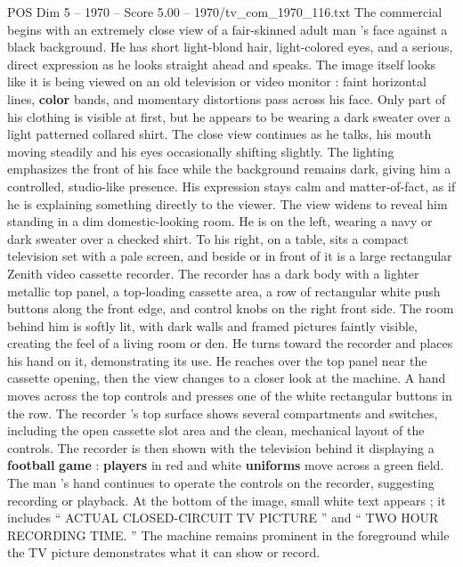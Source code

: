 \begin{textsample}{POS Dim 5 – 1970 – Score 5.00 – 1970/tv\_com\_1970\_116.txt}  \label{ex:f5_pos_087}
The commercial begins with an extremely close view of a fair-skinned adult man ’s face against a black background.
He has short light-blond hair, light-colored eyes, and a serious, direct expression as he looks straight ahead and speaks.
The image itself looks like it is being viewed on an old television or video monitor : faint horizontal lines, \textbf{color} bands, and momentary distortions pass across his face.
Only part of his clothing is visible at first, but he appears to be wearing a dark sweater over a light patterned collared shirt.
The close view continues as he talks, his mouth moving steadily and his eyes occasionally shifting slightly.
The lighting emphasizes the front of his face while the background remains dark, giving him a controlled, studio-like presence.
His expression stays calm and matter-of-fact, as if he is explaining something directly to the viewer.
The view widens to reveal him standing in a dim domestic-looking room.
He is on the left, wearing a navy or dark sweater over a checked shirt.
To his right, on a table, sits a compact television set with a pale screen, and beside or in front of it is a large rectangular Zenith video cassette recorder.
The recorder has a dark body with a lighter metallic top panel, a top-loading cassette area, a row of rectangular white push buttons along the front edge, and control knobs on the right front side.
The room behind him is softly lit, with dark walls and framed pictures faintly visible, creating the feel of a living room or den.
He turns toward the recorder and places his hand on it, demonstrating its use.
He reaches over the top panel near the cassette opening, then the view changes to a closer look at the machine.
A hand moves across the top controls and presses one of the white rectangular buttons in the row.
The recorder ’s top surface shows several compartments and switches, including the open cassette slot area and the clean, mechanical layout of the controls.
The recorder is then shown with the television behind it displaying a \textbf{football} \textbf{game} : \textbf{players} in red and white \textbf{uniforms} move across a green field.
The man ’s hand continues to operate the controls on the recorder, suggesting recording or playback.
At the bottom of the image, small white text appears ; it includes “ ACTUAL CLOSED-CIRCUIT TV PICTURE ” and “ TWO HOUR RECORDING TIME. ” The machine remains prominent in the foreground while the TV picture demonstrates what it can show or record.

\end{textsample}
